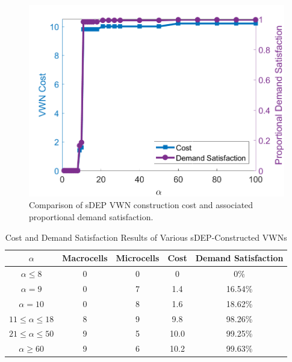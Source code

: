 \documentclass[12pt,dvipsnames]{report}
\begin{document}
\begin{figure}[ht]
	\centering
	\includegraphics[height=0.4\textheight]{Figures/CaseII_sDEPComparisonCostSat}
	\caption[Comparison of Case II sDEP approach cost and demand satisfaction]{Comparison of sDEP VWN construction cost and associated proportional demand satisfaction.}
	\label{fig:CaseII_sDepComparisonCostSat}
\end{figure}

\begin{table}[ht]
	\centering
	\caption[Case II Cost and Demand Satisfaction Results of Various sDEP-Constructed VWNs]{Cost and Demand Satisfaction Results of Various sDEP-Constructed VWNs}
	\begin{tabular}{|c|c|c|c|c|}
		\hline
		\textbf{$\alpha$} & \textbf{Macrocells} & \textbf{Microcells} & \textbf{Cost} & \textbf{Demand Satisfaction} \\ 
		\hline
		$\alpha \leq 8$ & 0 & 0 & 0 & 0\% \\ 
		\hline
		$\alpha = 9$ & 0 & 7 & 1.4 & 16.54\% \\ 
		\hline
		$\alpha = 10$ & 0 & 8 & 1.6 & 18.62\% \\ 
		\hline
		$11 \leq \alpha \leq 18$ & 8 & 9 & 9.8 & 98.26\% \\ 
		\hline
		$21 \leq \alpha \leq 50$ & 9 & 5 & 10.0 & 99.25\% \\ 
		\hline
		$\alpha \geq 60$ & 9 & 6 & 10.2 & 99.63\% \\ 
		\hline
	\end{tabular}
	\label{tab:CaseII_sDEPCostSat}
\end{table}
\end{document}
